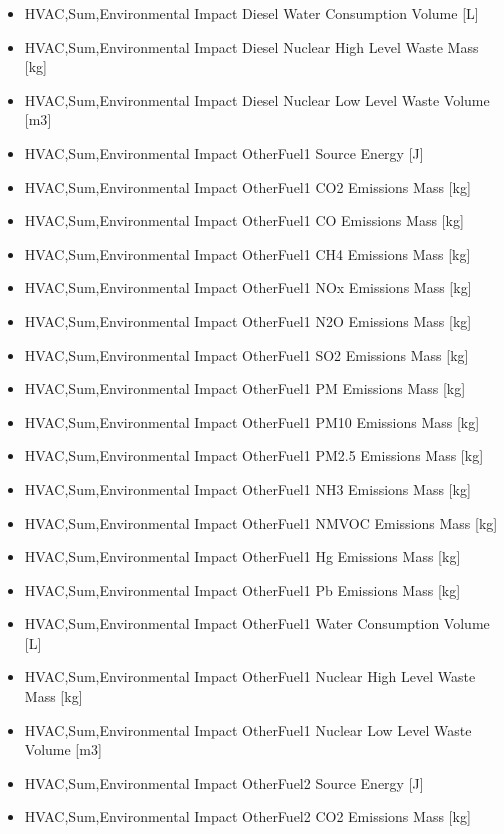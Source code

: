 \begin{itemize}
\item
  HVAC,Sum,Environmental Impact Diesel Water Consumption Volume {[}L{]}
\item
  HVAC,Sum,Environmental Impact Diesel Nuclear High Level Waste Mass {[}kg{]}
\item
  HVAC,Sum,Environmental Impact Diesel Nuclear Low Level Waste Volume {[}m3{]}
\item
  HVAC,Sum,Environmental Impact OtherFuel1 Source Energy {[}J{]}
\item
  HVAC,Sum,Environmental Impact OtherFuel1 CO2 Emissions Mass {[}kg{]}
\item
  HVAC,Sum,Environmental Impact OtherFuel1 CO Emissions Mass {[}kg{]}
\item
  HVAC,Sum,Environmental Impact OtherFuel1 CH4 Emissions Mass {[}kg{]}
\item
  HVAC,Sum,Environmental Impact OtherFuel1 NOx Emissions Mass {[}kg{]}
\item
  HVAC,Sum,Environmental Impact OtherFuel1 N2O Emissions Mass {[}kg{]}
\item
  HVAC,Sum,Environmental Impact OtherFuel1 SO2 Emissions Mass {[}kg{]}
\item
  HVAC,Sum,Environmental Impact OtherFuel1 PM Emissions Mass {[}kg{]}
\item
  HVAC,Sum,Environmental Impact OtherFuel1 PM10 Emissions Mass {[}kg{]}
\item
  HVAC,Sum,Environmental Impact OtherFuel1 PM2.5 Emissions Mass {[}kg{]}
\item
  HVAC,Sum,Environmental Impact OtherFuel1 NH3 Emissions Mass {[}kg{]}
\item
  HVAC,Sum,Environmental Impact OtherFuel1 NMVOC Emissions Mass {[}kg{]}
\item
  HVAC,Sum,Environmental Impact OtherFuel1 Hg Emissions Mass {[}kg{]}
\item
  HVAC,Sum,Environmental Impact OtherFuel1 Pb Emissions Mass {[}kg{]}
\item
  HVAC,Sum,Environmental Impact OtherFuel1 Water Consumption Volume {[}L{]}
\item
  HVAC,Sum,Environmental Impact OtherFuel1 Nuclear High Level Waste Mass {[}kg{]}
\item
  HVAC,Sum,Environmental Impact OtherFuel1 Nuclear Low Level Waste Volume {[}m3{]}
\item
  HVAC,Sum,Environmental Impact OtherFuel2 Source Energy {[}J{]}
\item
  HVAC,Sum,Environmental Impact OtherFuel2 CO2 Emissions Mass {[}kg{]}

\end{itemize}
